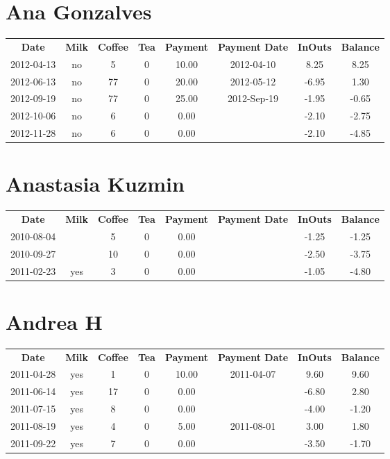 \section{Ana Gonzalves}

\begin{center}
\begin{tabular}{cccccccc}
\textbf{Date} & \textbf{Milk} & \textbf{Coffee} & \textbf{Tea} & \textbf{Payment} & \textbf{Payment Date} & \textbf{InOuts} & \textbf{Balance} \\
2012-04-13 & no &  5 & 0 & 10.00 & 2012-04-10 &  8.25 &  8.25\\ 
2012-06-13 & no & 77 & 0 & 20.00 & 2012-05-12 & -6.95 &  1.30\\ 
2012-09-19 & no & 77 & 0 & 25.00 & 2012-Sep-19 & -1.95 & -0.65\\ 
2012-10-06 & no &  6 & 0 &  0.00 &  & -2.10 & -2.75\\ 
2012-11-28 & no &  6 & 0 &  0.00 &  & -2.10 & -4.85
\end{tabular}
\end{center}

\section{Anastasia Kuzmin}

\begin{center}
\begin{tabular}{cccccccc}
\textbf{Date} & \textbf{Milk} & \textbf{Coffee} & \textbf{Tea} & \textbf{Payment} & \textbf{Payment Date} & \textbf{InOuts} & \textbf{Balance} \\
2010-08-04 &  &  5 & 0 & 0.00 &  & -1.25 & -1.25\\ 
2010-09-27 &  & 10 & 0 & 0.00 &  & -2.50 & -3.75\\ 
2011-02-23 & yes &  3 & 0 & 0.00 &  & -1.05 & -4.80
\end{tabular}
\end{center}

\section{Andrea H}

\begin{center}
\begin{tabular}{cccccccc}
\textbf{Date} & \textbf{Milk} & \textbf{Coffee} & \textbf{Tea} & \textbf{Payment} & \textbf{Payment Date} & \textbf{InOuts} & \textbf{Balance} \\
2011-04-28 & yes &  1 & 0 & 10.00 & 2011-04-07 &  9.60 &  9.60\\ 
2011-06-14 & yes & 17 & 0 &  0.00 &  & -6.80 &  2.80\\ 
2011-07-15 & yes &  8 & 0 &  0.00 &  & -4.00 & -1.20\\ 
2011-08-19 & yes &  4 & 0 &  5.00 & 2011-08-01 &  3.00 &  1.80\\ 
2011-09-22 & yes &  7 & 0 &  0.00 &  & -3.50 & -1.70
\end{tabular}
\end{center}

